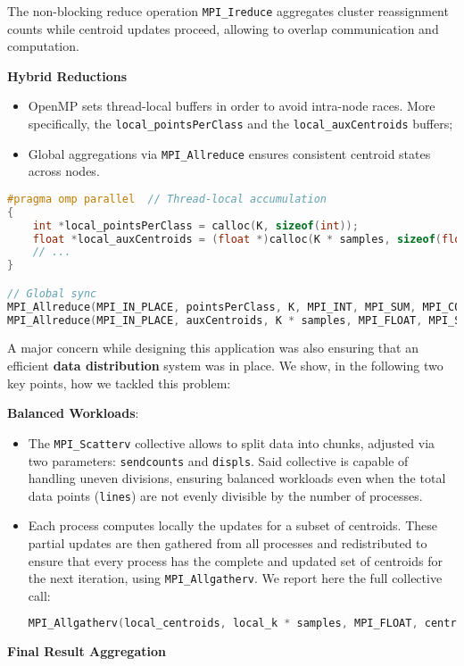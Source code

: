 \documentclass[11pt, journal]{IEEEtran}
\newcommand{\nwl}{

\vspace{11pt}

}
\begin{document}
The non-blocking reduce operation \texttt{MPI\_Ireduce} aggregates cluster reassignment counts while centroid updates proceed, allowing to overlap communication and computation.
\nwl
\noindent \textbf{Hybrid Reductions}
\begin{itemize}
    \item OpenMP sets thread-local buffers in order to avoid intra-node races. More specifically, the \texttt{local\_pointsPerClass} and the \texttt{local\_auxCentroids} buffers;
    \item Global aggregations via \texttt{MPI\_Allreduce} ensures consistent centroid states across nodes.
\end{itemize}
\nwl
\begin{lstlisting}[language=C]
#pragma omp parallel  // Thread-local accumulation
{ 
    int *local_pointsPerClass = calloc(K, sizeof(int)); 
    float *local_auxCentroids = (float *)calloc(K * samples, sizeof(float));
    // ...
}

// Global sync
MPI_Allreduce(MPI_IN_PLACE, pointsPerClass, K, MPI_INT, MPI_SUM, MPI_COMM_WORLD); 
MPI_Allreduce(MPI_IN_PLACE, auxCentroids, K * samples, MPI_FLOAT, MPI_SUM, MPI_COMM_WORLD);\end{lstlisting}
\nwl
A major concern while designing this application was also ensuring that an efficient \textbf{data distribution} system was in place. We show, in the following two key points, how we tackled this problem:
\nwl
\noindent \textbf{Balanced Workloads}:
\begin{itemize}
    \item The \texttt{MPI\_Scatterv} collective allows to split data into chunks, adjusted via two parameters: \texttt{sendcounts} and \texttt{displs}. Said collective is capable of handling uneven divisions, ensuring balanced workloads even when the total data points (\texttt{lines}) are not evenly divisible by the number of processes.
    \item Each process computes locally the updates for a subset of centroids. These partial updates are then gathered from all processes and redistributed to ensure that every process has the complete and updated set of centroids for the next iteration, using \texttt{MPI\_Allgatherv}. We report here the full collective call:
\begin{lstlisting}[language = C]
MPI_Allgatherv(local_centroids, local_k * samples, MPI_FLOAT, centroids, centroid_sendcounts, centroid_displs, MPI_FLOAT, MPI_COMM_WORLD);
\end{lstlisting}
\end{itemize}
\nwl
\noindent \textbf{Final Result Aggregation}
\end{document}
